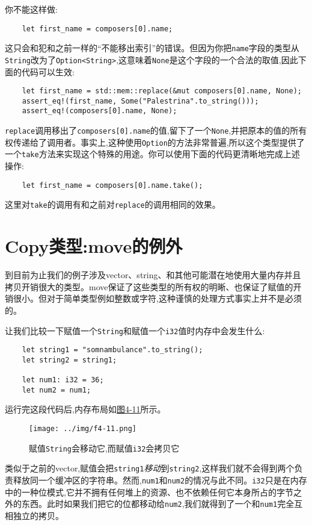 你不能这样做:
\begin{verbatim}
    let first_name = composers[0].name;
\end{verbatim}

这只会和犯和之前一样的“不能移出索引”的错误。但因为你把\texttt{name}字段的类型从\texttt{String}改为了\texttt{Option<String>},这意味着\texttt{None}是这个字段的一个合法的取值,因此下面的代码可以生效:
\begin{verbatim}
    let first_name = std::mem::replace(&mut composers[0].name, None);
    assert_eq!(first_name, Some("Palestrina".to_string()));
    assert_eq!(composers[0].name, None);
\end{verbatim}

\texttt{replace}调用移出了\texttt{composers[0].name}的值,留下了一个\texttt{None},并把原本的值的所有权传递给了调用者。事实上,这种使用\texttt{Option}的方法非常普遍,所以这个类型提供了一个\texttt{take}方法来实现这个特殊的用途。你可以使用下面的代码更清晰地完成上述操作:
\begin{verbatim}
    let first_name = composers[0].name.take();
\end{verbatim}
这里对\texttt{take}的调用有和之前对\texttt{replace}的调用相同的效果。

\section{Copy类型:move的例外}\label{copy}
到目前为止我们的例子涉及vector、string、和其他可能潜在地使用大量内存并且拷贝开销很大的类型。move保证了这些类型的所有权的明晰、也保证了赋值的开销很小。但对于简单类型例如整数或字符,这种谨慎的处理方式事实上并不是必须的。

让我们比较一下赋值一个\texttt{String}和赋值一个\texttt{i32}值时内存中会发生什么:
\begin{verbatim}
    let string1 = "somnambulance".to_string();
    let string2 = string1;

    let num1: i32 = 36;
    let num2 = num1;
\end{verbatim}

运行完这段代码后,内存布局如\hyperref[f4-11]{图4-11}所示。
\begin{figure}[htbp]
    \centering
    \texttt{[image: ../img/f4-11.png]}
    \caption{赋值\texttt{String}会移动它,而赋值\texttt{i32}会拷贝它}
    \label{f4-11}
\end{figure}

类似于之前的vector,赋值会把\texttt{string1}\emph{移动}到\texttt{string2},这样我们就不会得到两个负责释放同一个缓冲区的字符串。然而,\texttt{num1}和\texttt{num2}的情况与此不同。\texttt{i32}只是在内存中的一种位模式,它并不拥有任何堆上的资源、也不依赖任何它本身所占的字节之外的东西。此时如果我们把它的位都移动给\texttt{num2},我们就得到了一个和\texttt{num1}完全互相独立的拷贝。

